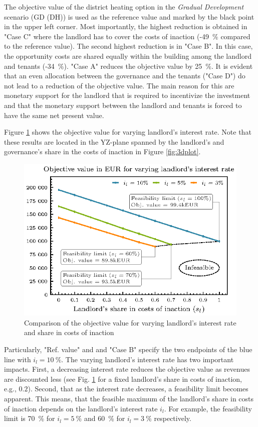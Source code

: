 The objective value of the district heating option in the \textit{Gradual Development} scenario (GD (DH)) is used as the reference value and marked by the black point in the upper left corner. Most importantly, the highest reduction is obtained in "Case C" where the landlord has to cover the costs of inaction (-\SI{49}{\%} compared to the reference value). The second highest reduction is in "Case B". In this case, the opportunity costs are shared equally within the building among the landlord and tenants (-\SI{34}{\%}). "Case A" reduces the objective value by \SI{25}{\%}.  It is evident that an even allocation between the governance and the tenants ("Case D") do not lead to a reduction of the objective value. The main reason for this are monetary support for the landlord that is required to incentivize the investment and that the monetary support between the landlord and tenants is forced to have the same net present value.\vspace{0.5cm}

Figure \ref{fig:feasible} shows the objective value for varying landlord's interest rate. Note that these results are located in the YZ-plane spanned by the landlord's and governance's share in the costs of inaction in Figure \ref{fig:3dplot}. 

\begin{figure}[h]
	\centering
	\includegraphics[width=0.65\linewidth]{figures/4_Results/fig_feasible/feasible.eps}
	\caption{Comparison of the objective value for varying landlord's interest rate and share in costs of inaction}
	\label{fig:feasible}
\end{figure}

Particularly, "Ref. value" and and "Case B" specify the two endpoints of the blue line with $i_l=\SI{10}{\%}$. The varying landlord's interest rate has two important impacts. First, a decreasing interest rate reduces the objective value as revenues are discounted less (see Fig. \ref{fig:feasible} for a fixed landlord's share in costs of inaction, e.g., $0.2$). Second, that as the interest rate decreases, a feasibility limit becomes apparent. This means, that the feasible maximum of the landlord's share in costs of inaction depends on the landlord's interest rate $i_l$. For example, the feasibility limit is \SI{70}{\%} for $i_l=\SI{5}{\%}$ and \SI{60}{\%} for $i_l=\SI{3}{\%}$ respectively. 



